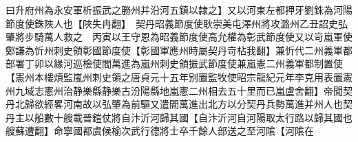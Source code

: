 曰升府州為永安軍析振武之勝州并沿河五鎮以隸之】又以河東左都押牙劉銖為河陽節度使銖陜人也【陜失冉翻】　契丹昭義節度使耿崇美屯澤州將攻潞州乙丑詔史弘肇將步騎萬人救之　丙寅以王守恩為昭義節度使高允權為彰武節度使又以岢嵐軍使鄭謙為忻州刺史領彰國節度使【彰國軍應州時屬契丹岢枮我翻】兼忻代二州義軍都部署丁卯以緣河巡檢使閻萬進為嵐州刺史領振武節度使兼嵐憲二州義軍都制置使【憲州本樓煩監嵐州刺史領之唐貞元十五年别置監牧使昭宗龍紀元年李克用表置憲州九域志憲州治静樂縣静樂古汾陽縣地嵐憲二州相去五十里而已嵐盧舍翻】帝聞契丹北歸欲經畧河南故以弘肇為前驅又遣閻萬進出北方以分契丹兵勢萬進并州人也契丹主以船數十艘載晉鎧仗將自汴沂河歸其國【自汴沂河自河陽取太行路以歸其國也艘蘇遭翻】命寧國都虞候榆次武行德將士卒千餘人部送之至河隂【河隂在